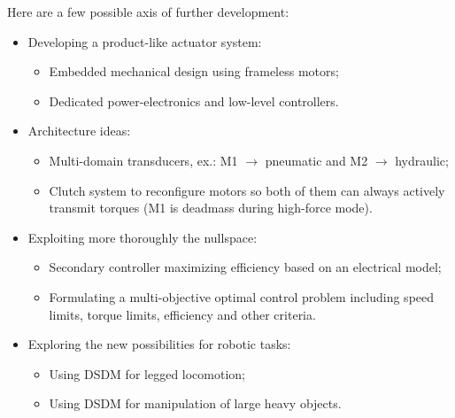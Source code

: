 Here are a few possible axis of further development:
%
\begin{itemize}
		\item Developing a product-like actuator system:
		\begin{itemize}
			\item Embedded mechanical design using frameless motors;
			\item Dedicated power-electronics and low-level controllers.
		\end{itemize}
		\item Architecture ideas:
		\begin{itemize}
			\item Multi-domain transducers, ex.: M1 $\rightarrow$ pneumatic and M2 $\rightarrow$ hydraulic;
			\item Clutch system to reconfigure motors so both of them can always actively transmit torques (M1 is deadmass during high-force mode).
		\end{itemize}
		\item Exploiting more thoroughly the nullspace:
		\begin{itemize}
			\item Secondary controller maximizing efficiency based on an electrical model;
			\item Formulating a multi-objective optimal control problem including speed limits, torque limits, efficiency and other criteria.
		\end{itemize}
		\item Exploring the new possibilities for robotic tasks:
		\begin{itemize}
			\item Using DSDM for legged locomotion;
			\item Using DSDM for manipulation of large heavy objects.
		\end{itemize}
\end{itemize}